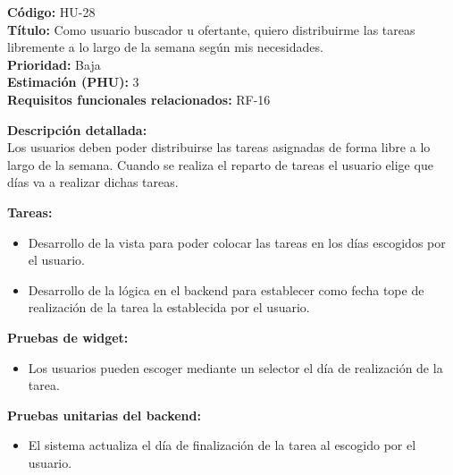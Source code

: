 \begin{tarjetaHU}
\textbf{Código:} HU-28 \\
\textbf{Título:} Como usuario buscador u ofertante, quiero distribuirme las tareas libremente a lo largo de la semana según mis necesidades. \\
\textbf{Prioridad:} Baja \\
\textbf{Estimación (PHU):} 3 \\
\textbf{Requisitos funcionales relacionados:} RF-16

\vspace{0.5em}
\textbf{Descripción detallada:} \\
Los usuarios deben poder distribuirse las tareas asignadas de forma libre a lo largo de la semana. Cuando se realiza el reparto de tareas el usuario elige que días va a realizar dichas tareas. 

\vspace{0.5em}
\textbf{Tareas:}
\begin{itemize}[left=0pt]
  \item Desarrollo de la vista para poder colocar las tareas en los días escogidos por el usuario.
  \item Desarrollo de la lógica en el backend para establecer como fecha tope de realización de la tarea la establecida por el usuario.
\end{itemize}

\vspace{0.5em}
\textbf{Pruebas de widget:}
\begin{itemize}[left=0pt]
  \item Los usuarios pueden escoger mediante un selector el día de realización de la tarea.
\end{itemize}
\textbf{Pruebas unitarias del backend:}
\begin{itemize}[left=0pt]
  \item El sistema actualiza el día de finalización de la tarea al escogido por el usuario.
\end{itemize}
\end{tarjetaHU}

